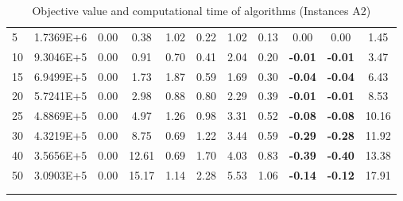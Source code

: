 {\begin{longtable}{@{}llccccccccc@{}}
\multicolumn{1}{l|}{5}  & \multicolumn{1}{l|}{1.7369E+6}  & 0.00 & \multicolumn{1}{c|}{0.38}  & 1.02  & \multicolumn{1}{c|}{0.22} & 1.02  & \multicolumn{1}{c|}{0.13} & 0.00           & 0.00           & 1.45  \\
\multicolumn{1}{l|}{10} & \multicolumn{1}{l|}{9.3046E+5}  & 0.00 & \multicolumn{1}{c|}{0.91}  & 0.70  & \multicolumn{1}{c|}{0.41} & 2.04  & \multicolumn{1}{c|}{0.20} & \textbf{-0.01} & \textbf{-0.01} & 3.47  \\
\multicolumn{1}{l|}{15} & \multicolumn{1}{l|}{6.9499E+5}  & 0.00 & \multicolumn{1}{c|}{1.73}  & 1.87  & \multicolumn{1}{c|}{0.59} & 1.69  & \multicolumn{1}{c|}{0.30} & \textbf{-0.04} & \textbf{-0.04} & 6.43  \\
\multicolumn{1}{l|}{20} & \multicolumn{1}{l|}{5.7241E+5}  & 0.00 & \multicolumn{1}{c|}{2.98}  & 0.88  & \multicolumn{1}{c|}{0.80} & 2.29  & \multicolumn{1}{c|}{0.39} & \textbf{-0.01} & \textbf{-0.01} & 8.53  \\
\multicolumn{1}{l|}{25} & \multicolumn{1}{l|}{4.8869E+5}  & 0.00 & \multicolumn{1}{c|}{4.97}  & 1.26  & \multicolumn{1}{c|}{0.98} & 3.31  & \multicolumn{1}{c|}{0.52} & \textbf{-0.08} & \textbf{-0.08} & 10.16 \\
\multicolumn{1}{l|}{30} & \multicolumn{1}{l|}{4.3219E+5}  & 0.00 & \multicolumn{1}{c|}{8.75}  & 0.69  & \multicolumn{1}{c|}{1.22} & 3.44  & \multicolumn{1}{c|}{0.59} & \textbf{-0.29} & \textbf{-0.28} & 11.92 \\
\multicolumn{1}{l|}{40} & \multicolumn{1}{l|}{3.5656E+5}  & 0.00 & \multicolumn{1}{c|}{12.61} & 0.69  & \multicolumn{1}{c|}{1.70} & 4.03  & \multicolumn{1}{c|}{0.83} & \textbf{-0.39} & \textbf{-0.40} & 13.38 \\
\multicolumn{1}{l|}{50} & \multicolumn{1}{l|}{3.0903E+5}  & 0.00 & \multicolumn{1}{c|}{15.17} & 1.14  & \multicolumn{1}{c|}{2.28} & 5.53  & \multicolumn{1}{c|}{1.06} & \textbf{-0.14} & \textbf{-0.12} & 17.91 \\ \hline
\caption{Objective value and computational time of algorithms (Instances A2)}\\
\label{results-all-A2}\\
\end{longtable}}